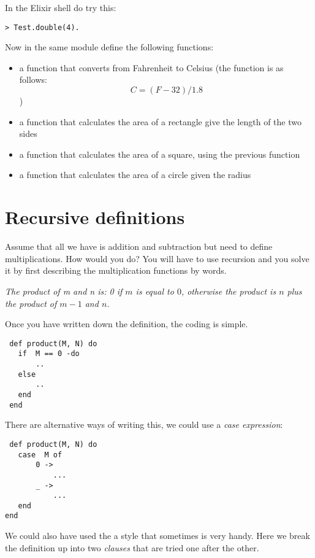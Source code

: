 \documentclass[a4paper,11pt]{article}
\begin{document}
{In the Elixir shell do try this:

\begin{verbatim}
> Test.double(4).
\end{verbatim}

Now in the same module define the following functions:

\begin{itemize}
\item a function that converts from Fahrenheit to Celsius (the
  function is as follows:$$C = (F-32)/1.8$$)

\item a function that calculates the area of a rectangle give the
  length of the two sides

\item a function that calculates the area of a square, using the
  previous function

\item a function that calculates the area of a circle given the radius
\end{itemize} 

\section{Recursive definitions}

Assume that all we have is addition and subtraction but need to define
multiplications. How would you do? You will have to use recursion and
you solve it by first describing the multiplication functions by words.

{\em The product of m and n is: 0 if $m$ is equal to $0$, otherwise the
  product is $n$ plus the product of $m-1$ and $n$.}

Once you have written down the definition, the coding is simple.

\begin{verbatim}
 def product(M, N) do
   if  M == 0 -do
       ..
   else 
       ..
   end
 end
\end{verbatim}

There are alternative ways of writing this, we could use a {\em case
  expression}:

\begin{verbatim}
 def product(M, N) do
   case  M of
       0 -> 
           ...
       _ -> 
           ...
   end
end
\end{verbatim}

We could also have used the a style that sometimes is very handy. Here
we break the definition up into two {\em clauses} that are tried one
after the other.

}
\end{document}
